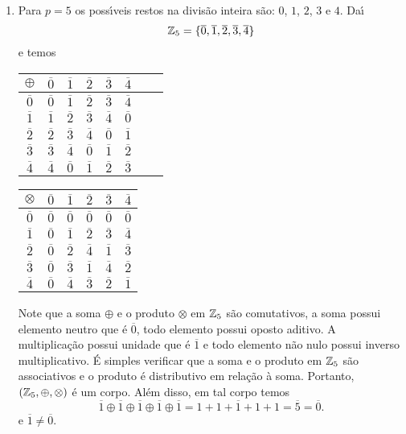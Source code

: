 \begin{exemplos}
\begin{enumerate}
	\item Para $p = 5$ os poss{\'\i}veis restos na divis\~ao inteira s\~ao: $0$, $1$, $2$, $3$ e $4$. Da{\'\i}
		\[
			\mathbb{Z}_5 = \{\overline{0}, \overline{1}, \overline{2}, \overline{3}, \overline{4}\}
		\]
	e temos
		\begin{center}
			\begin{tabular}{|c|c|c|c|c|c|c|c|}
				\hline
				$\oplus$ & $\overline{0}$ & $\overline{1}$ & $\overline{2}$ & $\overline{3}$ & $\overline{4}$\\\hline
				$\overline{0}$ & $\overline{0}$ & $\overline{1}$ & $\overline{2}$ & $\overline{3}$ & $\overline{4}$\\\hline
				$\overline{1}$ & $\overline{1}$ & $\overline{2}$ & $\overline{3}$ & $\overline{4}$ & $\overline{0}$\\\hline
				$\overline{2}$ & $\overline{2}$ & $\overline{3}$ & $\overline{4}$& $\overline{0}$ & $\overline{1}$ \\\hline
				$\overline{3}$ & $\overline{3}$ & $\overline{4}$ & $\overline{0}$& $\overline{1}$ & $\overline{2}$ \\\hline
				$\overline{4}$ & $\overline{4}$ & $\overline{0}$ & $\overline{1}$& $\overline{2}$ & $\overline{3}$ \\\hline
			\end{tabular} \qquad 
			\begin{tabular}{|c|c|c|c|c|c|}
				\hline
				$\otimes$ & $\overline{0}$ & $\overline{1}$ & $\overline{2}$ & $\overline{3}$ & $\overline{4}$\\\hline
				$\overline{0}$ & $\overline{0}$ & $\overline{0}$ & $\overline{0}$ & $\overline{0}$ & $\overline{0}$\\\hline
				$\overline{1}$ & $\overline{0}$ & $\overline{1}$ & $\overline{2}$ & $\overline{3}$ & $\overline{4}$\\\hline
				$\overline{2}$ & $\overline{0}$ & $\overline{2}$ & $\overline{4}$& $\overline{1}$ & $\overline{3}$ \\\hline
				$\overline{3}$ & $\overline{0}$ & $\overline{3}$ & $\overline{1}$& $\overline{4}$ & $\overline{2}$ \\\hline
				$\overline{4}$ & $\overline{0}$ & $\overline{4}$ & $\overline{3}$& $\overline{2}$ & $\overline{1}$ \\\hline
			\end{tabular}
		\end{center}
	Note que a soma $\oplus$ e o produto $\otimes$ em $\mathbb{Z}_5$ s\~ao comutativos, a soma possui elemento neutro que \'e $\overline{0}$, todo elemento possui
	oposto aditivo. A multiplica\c{c}\~ao possui unidade que \'e $\overline{1}$ e todo elemento n\~ao nulo possui inverso multiplicativo. \'E simples verificar que a soma e o produto em $\mathbb{Z}_5$ s\~ao associativos e o produto \'e distributivo em rela\c{c}\~ao \`a soma. Portanto, $(\mathbb{Z}_5, \oplus, \otimes)$ \'e um corpo. Al\'em disso, em tal corpo temos
	\[
		\overline{1} \oplus \overline{1} \oplus \overline{1} \oplus \overline{1} \oplus \overline{1} = \overline{1 + 1 + 1 + 1 + 1} = \overline{5} = \overline{0}.
	\]
	e $\overline{1} \ne \overline{0}$.
\end{enumerate}
\end{exemplos}

